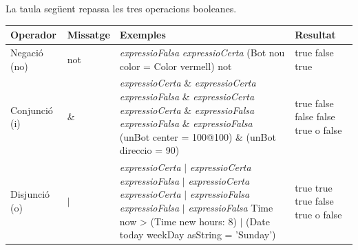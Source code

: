 \noindent
La taula següent repassa les tres operacions booleanes. 

\vspace*{3mm}
\noindent
\setlength{\extrarowheight}{1mm}
{\small \begin{tabular}{p{20mm}p{15mm}p{70mm}p{20mm}}
\hline
\textbf{Operador} & \textbf{Missatge} & \textbf{Exemples} & \textbf{Resultat} \\
\hline
Negació (\textsf{no}) & \textsf{not} &
\textsf{{\itshape expressioFalsa}} \newline
\textsf{{\itshape expressioCerta}} \newline
\textsf{(Bot nou color = Color vermell) not} &
\textsf{true} \newline
\textsf{false} \newline
\textsf{true} \\
Conjunció (\textsf{i}) & \textsf{\&} &
\textsf{{\itshape expressioCerta} \& {\itshape expressioCerta}} \newline
\textsf{{\itshape expressioFalsa} \& {\itshape expressioCerta}} \newline
\textsf{{\itshape expressioCerta} \& {\itshape expressioFalsa}} \newline
\textsf{{\itshape expressioFalsa} \& {\itshape expressioFalsa}} \newline
\textsf{(unBot center = 100@100) \& \newline (unBot direccio = 90)} &
\textsf{true} \newline
\textsf{false} \newline
\textsf{false} \newline
\textsf{false} \newline
\textsf{true} o \textsf{false}\\
Disjunció (\textsf{o}) & \textsf{$|$} &
\textsf{{\itshape expressioCerta} $|$ {\itshape expressioCerta}} \newline
\textsf{{\itshape expressioFalsa} $|$ {\itshape expressioCerta}} \newline
\textsf{{\itshape expressioCerta} $|$ {\itshape expressioFalsa}} \newline
\textsf{{\itshape expressioFalsa} $|$ {\itshape expressioFalsa}} \newline
\textsf{Time now \textgreater \hspace*{1mm} (Time new hours: 8) $|$ \newline (Date today weekDay asString = 'Sunday')} &
\textsf{true} \newline
\textsf{true} \newline
\textsf{true} \newline
\textsf{false} \newline
\textsf{true} o \textsf{false}\\
\hline
\end{tabular}}


